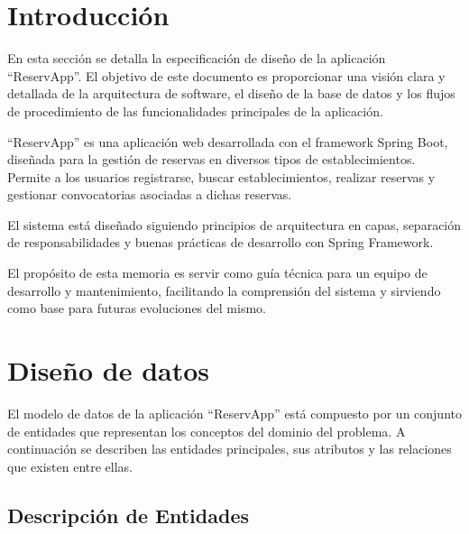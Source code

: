 
\section{Introducción}

En esta sección se detalla la especificación de diseño de la aplicación ``ReservApp''. El objetivo de este documento es proporcionar una visión clara y detallada de la arquitectura de software, el diseño de la base de datos y los flujos de procedimiento de las funcionalidades principales de la aplicación.

``ReservApp'' es una aplicación web desarrollada con el framework Spring Boot, diseñada para la gestión de reservas en diversos tipos de establecimientos. Permite a los usuarios registrarse, buscar establecimientos, realizar reservas y gestionar convocatorias asociadas a dichas reservas.

El sistema está diseñado siguiendo principios de arquitectura en capas, separación de responsabilidades y buenas prácticas de desarrollo con Spring Framework.

El propósito de esta memoria es servir como guía técnica para un equipo de desarrollo y mantenimiento, facilitando la comprensión del sistema y sirviendo como base para futuras evoluciones del mismo.

\section{Diseño de datos}

El modelo de datos de la aplicación ``ReservApp'' está compuesto por un conjunto de entidades que representan los conceptos del dominio del problema. A continuación se describen las entidades principales, sus atributos y las relaciones que existen entre ellas.

\subsection{Descripción de Entidades}

